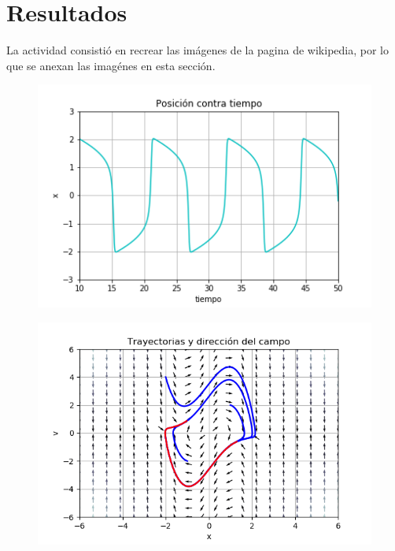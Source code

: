 \documentclass{article}
\begin{document}
\section{Resultados}
La actividad consistió en recrear las imágenes de la pagina de wikipedia, por lo que se anexan las imagénes en esta sección.

\begin{figure}[h]
\centering
\includegraphics[scale=0.59]{Posicion_contra_tiempo.png}
\end{figure}

\begin{figure}[h]
\centering
\includegraphics[scale=0.59]{FasesCondiciones.png}
\end{figure}
\end{document}
